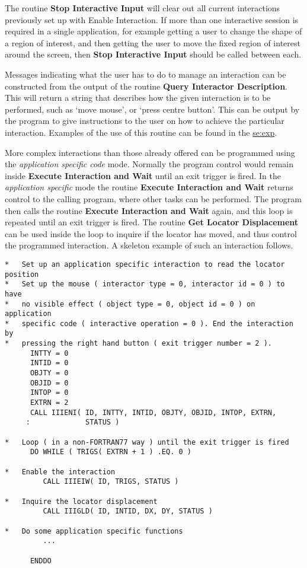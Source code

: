 The routine {\bf Stop Interactive Input} will clear out all current
interactions previously set up with {Enable Interaction}. If more than
one interactive session is required in a single application, for
example getting a user to change the shape of a region of interest,
and then getting the user to move the fixed region of interest around
the screen, then {\bf Stop Interactive Input} should be called between
each.

Messages indicating what the user has to do to manage an interaction
can be constructed from the output of the routine
{\bf Query Interactor Description}. This will return a string that describes
how the given interaction is to be performed, such as `move mouse', or
`press centre button'. This can be output by the program to give
instructions to the user on how to achieve the particular interaction.
Examples of the use of this routine can be found in the
\hyperref{example program}{example program in appendix~}{}{se:exp}.

More complex interactions than those already offered can be programmed
using the {\it application specific code} mode. Normally the program control
would remain inside {\bf Execute Interaction and Wait} until an exit
trigger is fired. In the {\it application specific} mode the routine
{\bf Execute Interaction and Wait} returns control to the calling program,
where other tasks can be performed. The program then calls the routine
{\bf Execute Interaction and Wait} again, and this loop is repeated until
an exit trigger is fired. The routine {\bf Get Locator Displacement} can
be used inside the loop to inquire if the locator has moved,
and thus control the programmed interaction. A skeleton example of
such an interaction follows.
\begin{small}
\begin{verbatim}
*   Set up an application specific interaction to read the locator position
*   Set up the mouse ( interactor type = 0, interactor id = 0 ) to have
*   no visible effect ( object type = 0, object id = 0 ) on application
*   specific code ( interactive operation = 0 ). End the interaction by
*   pressing the right hand button ( exit trigger number = 2 ).
      INTTY = 0
      INTID = 0
      OBJTY = 0
      OBJID = 0
      INTOP = 0
      EXTRN = 2
      CALL IIIENI( ID, INTTY, INTID, OBJTY, OBJID, INTOP, EXTRN,
     :             STATUS )

*   Loop ( in a non-FORTRAN77 way ) until the exit trigger is fired
      DO WHILE ( TRIGS( EXTRN + 1 ) .EQ. 0 )

*   Enable the interaction
         CALL IIIEIW( ID, TRIGS, STATUS )

*   Inquire the locator displacement
         CALL IIIGLD( ID, INTID, DX, DY, STATUS )

*   Do some application specific functions
         ...

      ENDDO
\end{verbatim}
\end{small}

